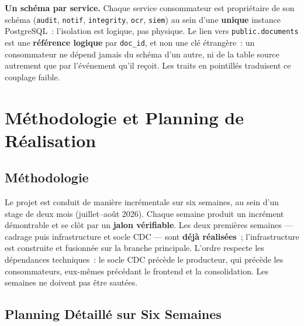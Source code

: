 \documentclass[12pt,a4paper,openany]{report}
\begin{document}
    \begin{notebox}
    \textbf{Un sch\'ema par service.} Chaque service consommateur est propri\'etaire de son sch\'ema (\texttt{audit}, \texttt{notif}, \texttt{integrity}, \texttt{ocr}, \texttt{siem}) au sein d'une \textbf{unique} instance PostgreSQL~: l'isolation est logique, pas physique. Le lien vers \texttt{public.documents} est une \textbf{r\'ef\'erence logique} par \texttt{doc\_id}, et non une cl\'e \'etrang\`ere~: un consommateur ne d\'epend jamais du sch\'ema d'un autre, ni de la table source autrement que par l'\'ev\'enement qu'il re\c{c}oit. Les traits en pointill\'es traduisent ce couplage faible.
    \end{notebox}

    \chapter{M\'ethodologie et Planning de R\'ealisation}
    \label{chap:planning}

    \section{M\'ethodologie}

    Le projet est conduit de mani\`ere incr\'ementale sur six semaines, au sein d'un stage de deux mois (juillet--ao\^ut 2026). Chaque semaine produit un incr\'ement d\'emontrable et se cl\^ot par un \textbf{jalon v\'erifiable}. Les deux premi\`eres semaines --- cadrage puis infrastructure et socle CDC --- sont \textbf{d\'ej\`a r\'ealis\'ees}~; l'infrastructure est construite et fusionn\'ee sur la branche principale. L'ordre respecte les d\'ependances techniques~: le socle CDC pr\'ec\`ede le producteur, qui pr\'ec\`ede les consommateurs, eux-m\^emes pr\'ec\'edant le frontend et la consolidation. Les semaines ne doivent pas \^etre saut\'ees.

    \section{Planning D\'etaill\'e sur Six Semaines}
\end{document}
